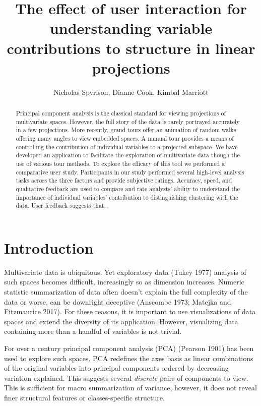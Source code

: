 \documentclass[
]{article}
\title{The effect of user interaction for understanding variable contributions
to structure in linear projections}
\author{Nicholas Spyrison, Dianne Cook, Kimbal Marriott}
\date{}
\begin{document}
\maketitle
\begin{abstract}
Principal component analysis is the classical standard for viewing
projections of multivariate spaces. However, the full story of the data
is rarely portrayed accurately in a few projections. More recently,
grand tours offer an animation of random walks offering many angles to
view embedded spaces. A manual tour provides a means of controlling the
contribution of individual variables to a projected subspace. We have
developed an application to facilitate the exploration of multivariate
data though the use of various tour methods. To explore the efficacy of
this tool we performed a comparative user study. Participants in our
study performed several high-level analysis tasks across the three
factors and provide subjective ratings. Accuracy, speed, and qualitative
feedback are used to compare and rate analysts' ability to understand
the importance of individual variables' contribution to distinguishing
clustering with the data. User feedback suggests that\ldots{}
\end{abstract}



\hypertarget{introduction}{%
\section{Introduction}\label{introduction}}

Multivariate data is ubiquitous. Yet exploratory data (Tukey 1977)
analysis of such spaces becomes difficult, increasingly so as dimension
increases. Numeric statistic summarization of data often doesn't explain
the full complexity of the data or worse, can be downright deceptive
(Anscombe 1973; Matejka and Fitzmaurice 2017). For these reasons, it is
important to use visualizations of data spaces and extend the diversity
of its application. However, visualizing data containing more than a
handful of variables is not trivial.

For over a century principal component analysis (PCA) (Pearson 1901) has
been used to explore such spaces. PCA redefines the axes basis as linear
combinations of the original variables into principal components ordered
by decreasing variation explained. This suggests several \emph{discrete}
pairs of components to view. This is sufficient for macro summarization
of variance, however, it does not reveal finer structural features or
classes-specific structure.
\end{document}
